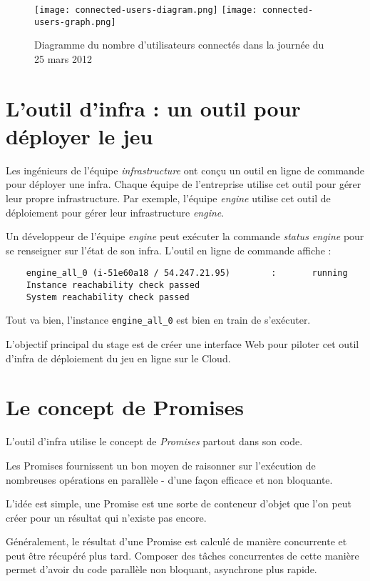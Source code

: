 \begin{figure}[H]
  \texttt{[image: connected-users-diagram.png]}
  \texttt{[image: connected-users-graph.png]}
  \caption{Diagramme du nombre d'utilisateurs connectés dans la journée du 25 mars 2012}
\end{figure}

\section{L'outil d'infra : un outil pour déployer le jeu}

Les ingénieurs de l'équipe \textit{infrastructure} ont conçu un outil en ligne
de commande pour déployer une infra.
Chaque équipe de l'entreprise utilise cet outil pour gérer leur propre
infrastructure. Par exemple, l'équipe \textit{engine} utilise cet outil de
déploiement pour gérer leur infrastructure \textit{engine}.

Un développeur de l'équipe \textit{engine} peut exécuter la commande
\textit{status engine} pour se renseigner sur l'état de son infra. L'outil en
ligne de commande affiche :
\begin{verbatim}
    engine_all_0 (i-51e60a18 / 54.247.21.95)        :       running
    Instance reachability check passed
    System reachability check passed
\end{verbatim}
Tout va bien, l'instance \verb?engine_all_0? est bien en train de s'exécuter.

L'objectif principal du stage est de créer une interface Web pour piloter cet
outil d'infra de déploiement du jeu en ligne sur le Cloud.

\section{Le concept de Promises}

L'outil d'infra utilise le concept de \textit{Promises} partout dans son code.

Les Promises fournissent un bon moyen de raisonner sur l'exécution de
nombreuses opérations en parallèle - d'une façon efficace et non bloquante.

L'idée est simple, une Promise est une sorte de conteneur d'objet que
l'on peut créer pour un résultat qui n'existe pas encore.

Généralement, le résultat d'une Promise est calculé de manière
concurrente et peut être récupéré plus tard.
Composer des tâches concurrentes de cette manière permet d'avoir du code
parallèle non bloquant, asynchrone plus rapide.

